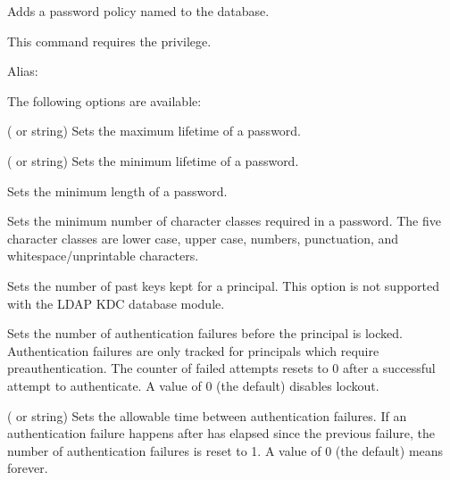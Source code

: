 \documentclass[letterpaper,10pt,english]{sphinxmanual}
\begin{document}
\sphinxAtStartPar
Adds a password policy named  to the database.

\sphinxAtStartPar
This command requires the  privilege.

\sphinxAtStartPar
Alias: 

\sphinxAtStartPar
The following options are available:
\begin{description}
\sphinxAtStartPar
( or  string) Sets the maximum
lifetime of a password.

\sphinxAtStartPar
( or  string) Sets the minimum
lifetime of a password.

\sphinxAtStartPar
Sets the minimum length of a password.

\sphinxAtStartPar
Sets the minimum number of character classes required in a
password.  The five character classes are lower case, upper case,
numbers, punctuation, and whitespace/unprintable characters.

\sphinxAtStartPar
Sets the number of past keys kept for a principal.  This option is
not supported with the LDAP KDC database module.

\end{description}
\label{\detokenize{admin/admin_commands/kadmin_local:policy-maxfailure}}\begin{description}
\sphinxAtStartPar
Sets the number of authentication failures before the principal is
locked.  Authentication failures are only tracked for principals
which require preauthentication.  The counter of failed attempts
resets to 0 after a successful attempt to authenticate.  A
 value of 0 (the default) disables lockout.

\end{description}
\label{\detokenize{admin/admin_commands/kadmin_local:policy-failurecountinterval}}\begin{description}
\sphinxAtStartPar
( or  string) Sets the allowable time
between authentication failures.  If an authentication failure
happens after  has elapsed since the previous
failure, the number of authentication failures is reset to 1.  A
 value of 0 (the default) means forever.

\end{description}
\end{document}
